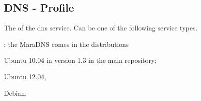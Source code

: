 \label{sec:dns_profile}
\subsection{DNS - Profile}


The  of the dns service. Can be one of the following 
service types.
\begin{asparaitem}
%
\item[\qcode{maradns}:] 
the MaraDNS comes in the distributions 
\begin{compactitem}
\item[\TheDistribution{ubuntu}] Ubuntu 10.04 in version 1.3 in the main repository;
\item[\TheDistribution{ubuntu}] Ubuntu 12.04,
\item[\TheDistribution{debian}] Debian,
\end{compactitem}
%
\end{asparaitem}

